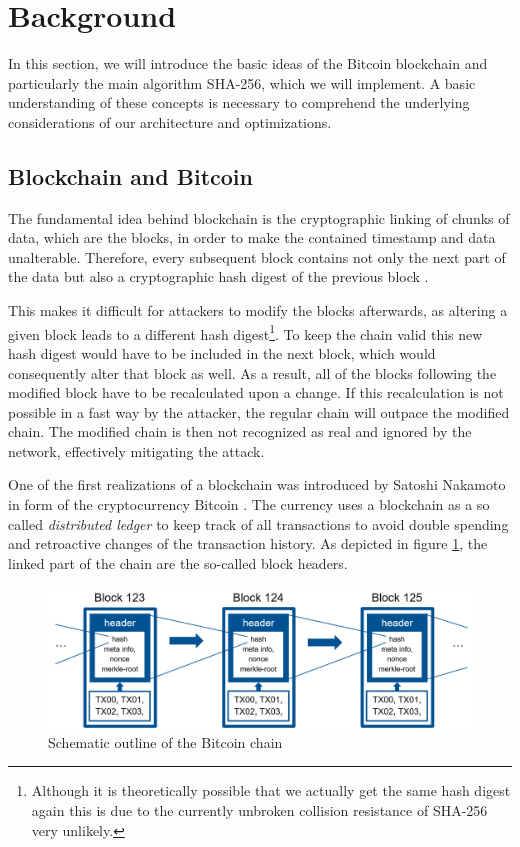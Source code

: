 \section{Background}
\label{background}

In this section, we will introduce the basic ideas of the Bitcoin blockchain and particularly the main algorithm SHA-256, which we will implement. A basic understanding of these concepts is necessary to comprehend the underlying considerations of our architecture and optimizations. 

\subsection{Blockchain and Bitcoin}

The fundamental idea behind blockchain is the cryptographic linking of chunks of data, which are the blocks, in order to make the contained timestamp and data unalterable.
Therefore, every subsequent block contains not only the next part of the data but also a cryptographic hash digest of the previous block \cite{haberStornetta1991}.

This makes it difficult for attackers to modify the blocks afterwards, as altering a given block leads to a different hash digest\footnote{Although it is theoretically possible that we actually get the same hash digest again this is due to the currently unbroken collision resistance of SHA-256 very unlikely.}.
To keep the chain valid this new hash digest would have to be included in the next block, which would consequently alter that block as well. 
As a result, all of the blocks following the modified block have to be recalculated upon a change. 
If this recalculation is not possible in a fast way by the attacker, the regular chain will outpace the modified chain. 
The modified chain is then not recognized as real and ignored by the network, effectively mitigating the attack.

One of the first realizations of a blockchain was introduced by Satoshi Nakamoto in form of the cryptocurrency Bitcoin \cite{bitcoinPaper}. 
The currency uses a blockchain as a so called \emph{distributed ledger} to keep track of all transactions to avoid double spending and retroactive changes of the transaction history. 
As depicted in figure \ref{fig:bitcoinchain}, the linked part of the chain are the so-called block headers. 

\begin{figure}[h]
	\centering
	\includegraphics[width=\textwidth]{img/bitcoinchain.png}
	\caption[Schematic outline of the Bitcoin chain]{Schematic outline of the Bitcoin chain}
	\label{fig:bitcoinchain}
\end{figure}

